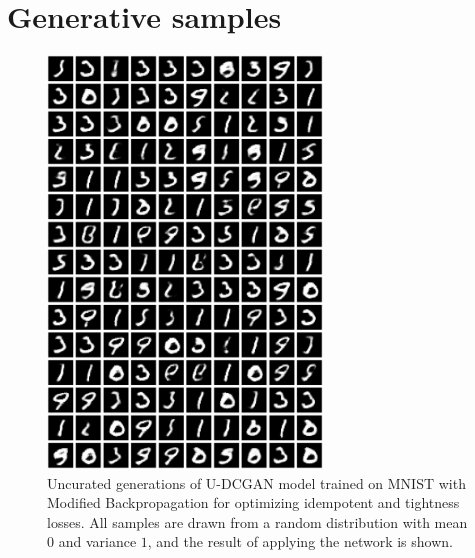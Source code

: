\documentclass{article}
\theoremstyle{plain}
\theoremstyle{definition}
\theoremstyle{remark}
\begin{document}
\newpage
\section{Generative samples}
\label{app:gen-samples}
\begin{figure}[H]
    \centering
    \includegraphics[width=0.65\textwidth]{./resources/modified_0-1_0-1_rand_samples.png}
    \caption{Uncurated generations of U-DCGAN model trained on MNIST with Modified Backpropagation for optimizing idempotent and tightness losses. All samples are drawn from a random distribution with mean $0$ and variance $1$, and the result of applying the network is shown.}
    \label{fig:big-gen-mnist}
\end{figure}

\newpage
\end{document}
